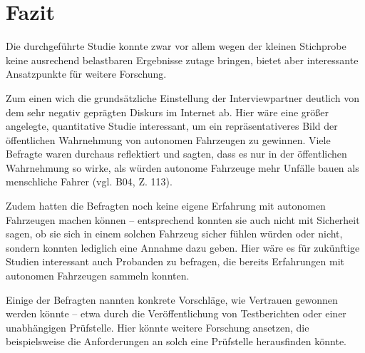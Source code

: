 \section{Fazit}

Die durchgeführte Studie konnte zwar vor allem wegen der kleinen Stichprobe keine ausrechend belastbaren Ergebnisse zutage bringen, bietet aber interessante Ansatzpunkte für weitere Forschung.

Zum einen wich die grundsätzliche Einstellung der Interviewpartner deutlich von dem sehr negativ geprägten Diskurs im Internet ab. Hier wäre eine größer angelegte, quantitative Studie interessant, um ein repräsentativeres Bild der öffentlichen Wahrnehmung von autonomen Fahrzeugen zu gewinnen. Viele Befragte waren durchaus reflektiert und sagten, dass es nur in der öffentlichen Wahrnehmung so wirke, als würden autonome Fahrzeuge mehr Unfälle bauen als menschliche Fahrer (vgl. B04, Z. 113).

Zudem hatten die Befragten noch keine eigene Erfahrung mit autonomen Fahrzeugen machen können -- entsprechend konnten sie auch nicht mit Sicherheit sagen, ob sie sich in einem solchen Fahrzeug sicher fühlen würden oder nicht, sondern konnten lediglich eine Annahme dazu geben. Hier wäre es für zukünftige Studien interessant auch Probanden zu befragen, die bereits Erfahrungen mit autonomen Fahrzeugen sammeln konnten.

Einige der Befragten nannten konkrete Vorschläge, wie Vertrauen gewonnen werden könnte -- etwa durch die Veröffentlichung von Testberichten oder einer unabhängigen Prüfstelle. Hier könnte weitere Forschung ansetzen, die beispielsweise die Anforderungen an solch eine Prüfstelle herausfinden könnte.
